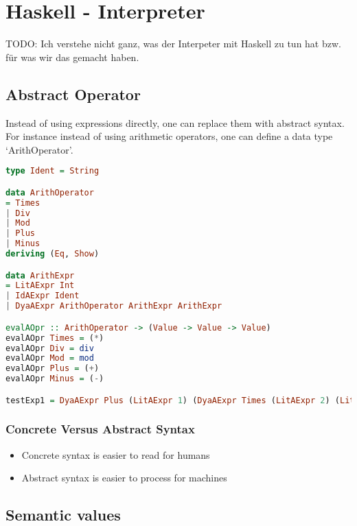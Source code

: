 \hypertarget{haskell}{%
\section{Haskell - Interpreter}\label{haskell}}

\begin{tcolorbox}[colback=red!5!white,colframe=red!75!black]
TODO: Ich verstehe nicht ganz, was der Interpeter mit Haskell zu tun hat bzw. für was wir das gemacht haben.
\end{tcolorbox}

\hypertarget{abstract-operator}{%
\subsection{Abstract Operator}\label{abstract-operator}}

Instead of using expressions directly, one can replace them with
abstract syntax. For instance instead of using arithmetic operators, one
can define a data type `ArithOperator'.

\begin{lstlisting}[language=Haskell]
type Ident = String

data ArithOperator
= Times
| Div
| Mod
| Plus
| Minus
deriving (Eq, Show)

data ArithExpr
= LitAExpr Int
| IdAExpr Ident
| DyaAExpr ArithOperator ArithExpr ArithExpr

evalAOpr :: ArithOperator -> (Value -> Value -> Value)
evalAOpr Times = (*)
evalAOpr Div = div
evalAOpr Mod = mod
evalAOpr Plus = (+)
evalAOpr Minus = (-)

testExp1 = DyaAExpr Plus (LitAExpr 1) (DyaAExpr Times (LitAExpr 2) (LitAExpr 3))
\end{lstlisting}

\hypertarget{concrete-versus-abstract-syntax}{%
\subsubsection{Concrete Versus Abstract
Syntax}\label{concrete-versus-abstract-syntax}}

\begin{itemize}
\tightlist
\item
  Concrete syntax is easier to read for humans
\item
  Abstract syntax is easier to process for machines
\end{itemize}

\hypertarget{semantic-values}{%
\subsection{Semantic values}\label{semantic-values}}

